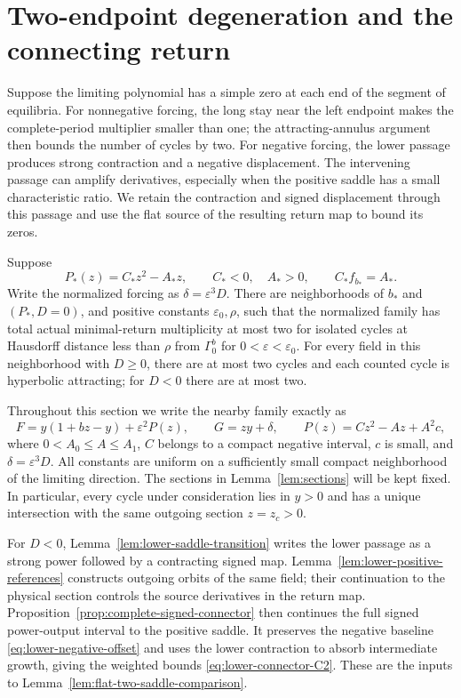 \section{Two-endpoint degeneration and the connecting return}
\label{sec:two-endpoints}

Suppose the limiting polynomial has a simple zero at each end of the
segment of equilibria. For nonnegative forcing, the long stay near the
left endpoint makes the complete-period multiplier smaller than one;
the attracting-annulus argument then bounds the number of cycles by two.
For negative forcing, the lower passage produces strong contraction and
a negative displacement. The intervening passage can amplify derivatives,
especially when the positive saddle has a small characteristic ratio.
We retain the contraction and signed displacement through this passage
and use the flat source of the resulting return map to bound its zeros.

\begin{proposition}\label{prop:two-endpoints}
Suppose
\[
 P_*(z)=C_*z^2-A_*z,\qquad C_*<0,\quad A_*>0,
 \qquad C_*f_{b_*}=A_* .
\]
Write the normalized forcing as $\delta=\varepsilon^3D$. There are
neighborhoods of $b_*$ and $(P_*,D=0)$, and positive constants
$\varepsilon_0,\rho$, such that the normalized family has total actual
minimal-return multiplicity at most two for isolated cycles at Hausdorff
distance less than $\rho$ from $\Gamma_0^b$
for $0<\varepsilon<\varepsilon_0$.
For every field in this neighborhood with $D\ge0$, there are at most two
cycles and each counted cycle is hyperbolic attracting; for $D<0$ there are at most two.
\end{proposition}

Throughout this section we write the nearby family exactly as
\begin{equation}\label{eq:lower-family}
 F=y(1+bz-y)+\varepsilon^2P(z),\qquad
 G=zy+\delta,\qquad
 P(z)=Cz^2-Az+A^2c,
\end{equation}
where $0<A_0\le A\le A_1$, $C$ belongs to a compact negative interval,
$c$ is small, and $\delta=\varepsilon^3D$. All constants are uniform
on a sufficiently small compact neighborhood of the limiting direction.
The sections in Lemma~\ref{lem:sections} will be kept fixed. In
particular, every cycle under consideration lies in $y>0$ and has a
unique intersection with the same outgoing section $z=z_c>0$.

For $D<0$, Lemma~\ref{lem:lower-saddle-transition} writes the lower
passage as a strong power followed by a contracting signed map.
Lemma~\ref{lem:lower-positive-references} constructs outgoing orbits of
the same field; their continuation to the physical section controls the
source derivatives in the return map. Proposition~\ref{prop:complete-signed-connector}
then continues the full signed power-output interval to the positive
saddle. It preserves the negative baseline
\eqref{eq:lower-negative-offset} and uses the lower contraction to absorb
intermediate growth, giving the weighted bounds
\eqref{eq:lower-connector-C2}. These are the inputs to
Lemma~\ref{lem:flat-two-saddle-comparison}.

